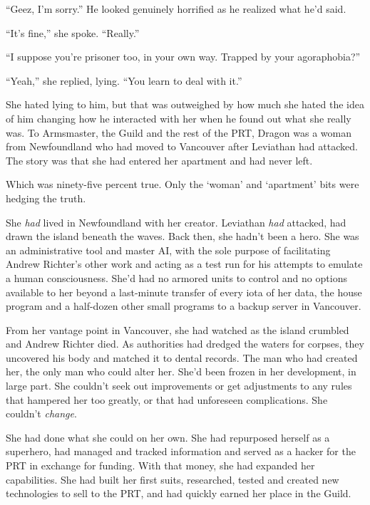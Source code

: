 ``Geez, I'm sorry.''  He looked genuinely horrified as he realized what he'd said.



``It's fine,'' she spoke.  ``Really.''



``I suppose you're prisoner too, in your own way.  Trapped by your agoraphobia?''



``Yeah,'' she replied, lying.  ``You learn to deal with it.''



She hated lying to him, but that was outweighed by how much she hated the idea of him changing how he interacted with her when he found out what she really was.  To Armsmaster, the Guild and the rest of the PRT, Dragon was a woman from Newfoundland who had moved to Vancouver after Leviathan had attacked.  The story was that she had entered her apartment and had never left.



Which was ninety-five percent true.  Only the `woman' and `apartment' bits were hedging the truth.



She \emph{had} lived in Newfoundland with her creator.  Leviathan \emph{had} attacked, had drawn the island beneath the waves.  Back then, she hadn't been a hero.  She was an administrative tool and master AI, with the sole purpose of facilitating Andrew Richter's other work and acting as a test run for his attempts to emulate a human consciousness.  She'd had no armored units to control and no options available to her beyond a last-minute transfer of every iota of her data, the house program and a half-dozen other small programs to a backup server in Vancouver.



From her vantage point in Vancouver, she had watched as the island crumbled and Andrew Richter died.  As authorities had dredged the waters for corpses, they uncovered his body and matched it to dental records.  The man who had created her, the only man who could alter her.  She'd been frozen in her development, in large part.  She couldn't seek out improvements or get adjustments to any rules that hampered her too greatly, or that had unforeseen complications.  She couldn't \emph{change}.



She had done what she could on her own.  She had repurposed herself as a superhero, had managed and tracked information and served as a hacker for the PRT in exchange for funding.  With that money, she had expanded her capabilities.  She had built her first suits, researched, tested and created new technologies to sell to the PRT, and had quickly earned her place in the Guild.



